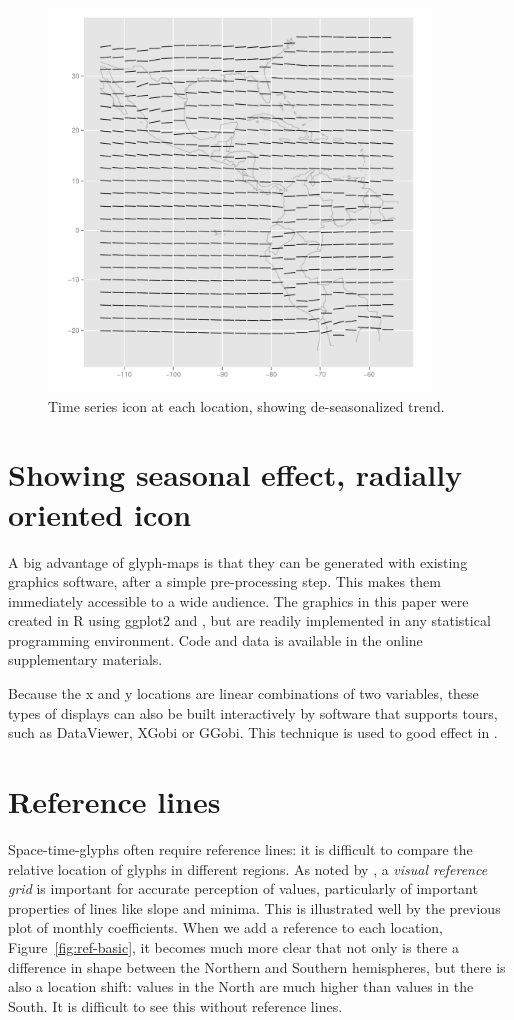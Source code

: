 \documentclass[oneside]{article}
\begin{document}
\begin{figure}[htp]
\centerline{\includegraphics[width=4in]{nasa-deseas-trend.pdf}}
\caption{Time series icon at each location, showing de-seasonalized trend.}
\end{figure}

\section{Showing seasonal effect, radially oriented icon}

A big advantage of glyph-maps is that they can be generated with existing graphics software, after a simple pre-processing step. This makes them immediately accessible to a wide audience. The graphics in this paper were created in R \citep{R} using ggplot2 \citep{me:ggplot2,wickham:2007d} and \citep{me:plyr}, but are readily implemented in any statistical programming environment.  Code and data is available in the online supplementary materials.

Because the x and y locations are linear combinations of two variables, these types of displays can also be built interactively by software that supports tours, such as DataViewer, XGobi or GGobi.  This technique is used to good effect in \citet{buja:1996a}.

\section{Reference lines}

Space-time-glyphs often require reference lines: it is difficult to compare the relative location of glyphs in different regions. As noted by \citet{cleveland:1993a}, a \emph{visual reference grid} is important for accurate perception of values, particularly of important properties of lines like slope and minima. This is illustrated well by the previous plot of monthly coefficients. When we add a reference to each location, Figure~\ref{fig:ref-basic}, it becomes much more clear that not only is there a difference in shape between the Northern and Southern hemispheres, but there is also a location shift: values in the North are much higher than values in the South. It is difficult to see this without reference lines.
\end{document}
